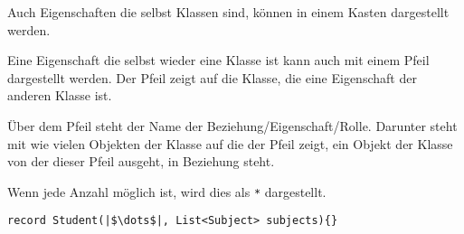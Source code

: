 \documentclass[a4paper]{scrartcl}
\begin{document}
Auch Eigenschaften die selbst Klassen sind, können in einem Kasten dargestellt werden.
\begin{center}
\end{center}


\noindent
Eine Eigenschaft die selbst wieder eine Klasse ist kann auch mit einem Pfeil dargestellt werden. Der Pfeil zeigt auf die Klasse, die eine Eigenschaft der anderen Klasse ist.
\begin{center}
\end{center}
Über dem Pfeil steht der Name der Beziehung/Eigenschaft/Rolle. Darunter steht mit wie vielen Objekten der Klasse auf die der Pfeil zeigt, ein Objekt der Klasse von der dieser Pfeil ausgeht, in Beziehung steht.


Wenn jede Anzahl möglich ist, wird dies als \texttt{*} dargestellt.
\begin{verbatim}
record Student(|$\dots$|, List<Subject> subjects){}
\end{verbatim}


\begin{center}
\end{center}
\end{document}
